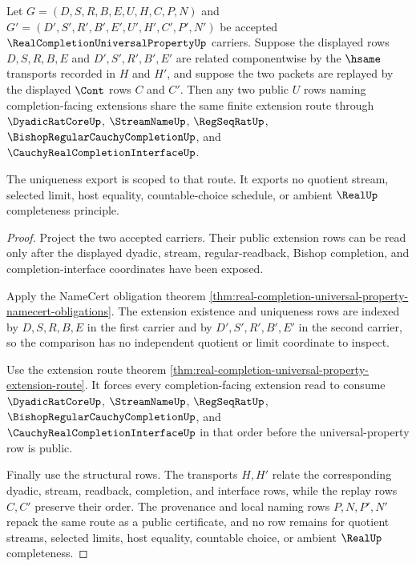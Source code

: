 \begin{theorem}
\label{thm:real-completion-universal-property-extension-uniqueness-scope}
Let $G=(D,S,R,B,E,U,H,C,P,N)$ and $G'=(D',S',R',B',E',U',H',C',P',N')$ be accepted $\RealCompletionUniversalPropertyUp$ carriers. Suppose the displayed rows $D,S,R,B,E$ and $D',S',R',B',E'$ are related componentwise by the $\hsame$ transports recorded in $H$ and $H'$, and suppose the two packets are replayed by the displayed $\Cont$ rows $C$ and $C'$. Then any two public $U$ rows naming completion-facing extensions share the same finite extension route through $\DyadicRatCoreUp$, $\StreamNameUp$, $\RegSeqRatUp$, $\BishopRegularCauchyCompletionUp$, and $\CauchyRealCompletionInterfaceUp$.

The uniqueness export is scoped to that route. It exports no quotient stream, selected limit, host equality, countable-choice schedule, or ambient $\RealUp$ completeness principle.
\end{theorem}
\begin{proof}
Project the two accepted carriers. Their public extension rows can be read only after the displayed dyadic, stream, regular-readback, Bishop completion, and completion-interface coordinates have been exposed.

Apply the NameCert obligation theorem \autoref{thm:real-completion-universal-property-namecert-obligations}. The extension existence and uniqueness rows are indexed by $D,S,R,B,E$ in the first carrier and by $D',S',R',B',E'$ in the second carrier, so the comparison has no independent quotient or limit coordinate to inspect.

Use the extension route theorem \autoref{thm:real-completion-universal-property-extension-route}. It forces every completion-facing extension read to consume $\DyadicRatCoreUp$, $\StreamNameUp$, $\RegSeqRatUp$, $\BishopRegularCauchyCompletionUp$, and $\CauchyRealCompletionInterfaceUp$ in that order before the universal-property row is public.

Finally use the structural rows. The transports $H,H'$ relate the corresponding dyadic, stream, readback, completion, and interface rows, while the replay rows $C,C'$ preserve their order. The provenance and local naming rows $P,N,P',N'$ repack the same route as a public certificate, and no row remains for quotient streams, selected limits, host equality, countable choice, or ambient $\RealUp$ completeness.
\end{proof}

